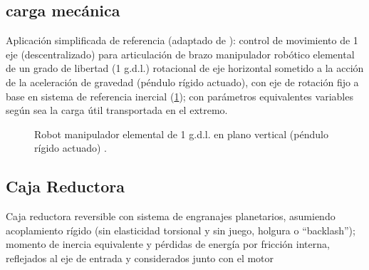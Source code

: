 \documentclass[a4paper, 10pt, onecolumn,journal]{ieeeconf}
\begin{document}
\subsection{\textbf{carga mecánica}}
Aplicación simplificada de referencia (adaptado de \cite{c2}): control de movimiento de 1 eje (descentralizado) para articulación de brazo manipulador robótico elemental de un grado de libertad (1 g.d.l.) rotacional de eje horizontal sometido a la acción de la aceleración de gravedad (péndulo rígido actuado), con eje de rotación fijo a base en sistema de referencia inercial (\cref{brazo}); con parámetros equivalentes variables según sea la carga útil transportada en el extremo.

\begin{figure}[thpb]
    \centering
    \begin{adjustbox}{max width=0.5\columnwidth}
    \end{adjustbox}
    \caption{Robot manipulador elemental de 1 g.d.l. en plano vertical (péndulo rígido actuado) \cite{c2}.}
    \label{brazo}
\end{figure}

\subsection{\textbf{Caja Reductora}}
Caja reductora reversible con sistema de engranajes planetarios, asumiendo acoplamiento rígido (sin elasticidad torsional y sin juego, holgura o ``backlash''); momento de inercia equivalente y pérdidas de energía por fricción interna, reflejados al eje de entrada y considerados junto con el motor
\end{document}
